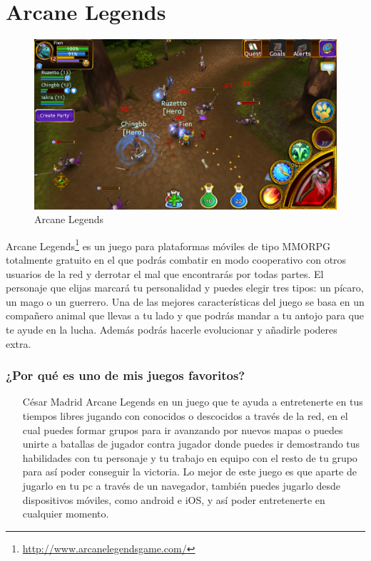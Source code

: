 \section{Arcane Legends}

\begin{figure}[htbp]
\begin{center}
\includegraphics[width=.60\textwidth]{./imagenes/arcanelegends.png}
\caption{Arcane Legends}
\label{Arcane Legends}
\end{center}
\end{figure}
Arcane Legends\footnote{\url{http://www.arcanelegendsgame.com/}} es un juego para plataformas móviles de tipo MMORPG totalmente gratuito en el que podrás combatir en modo cooperativo con otros usuarios de la red y derrotar el mal que encontrarás por todas partes. El personaje que elijas marcará tu personalidad y puedes elegir tres tipos: un pícaro, un mago o un guerrero. Una de las mejores características del juego se basa en un compañero animal que llevas a tu lado y que podrás mandar a tu antojo para que te ayude en la lucha. Además podrás hacerle evolucionar y añadirle poderes extra.

\subsubsection{¿Por qué es uno de mis juegos favoritos?}
\begin{itemize}
\item[César Madrid]Arcane Legends en un juego que te ayuda a entretenerte en tus tiempos libres jugando con conocidos o descocidos a través de la red, en el cual puedes formar grupos para ir avanzando por nuevos mapas o puedes unirte a batallas de jugador contra jugador donde puedes ir demostrando tus habilidades con tu personaje y tu trabajo en equipo con el resto de tu grupo para así poder conseguir la victoria. Lo mejor de este juego es que aparte de jugarlo en tu pc a través de un navegador, también puedes jugarlo desde dispositivos móviles, como android e iOS, y así poder entretenerte en cualquier momento.
\end{itemize}
